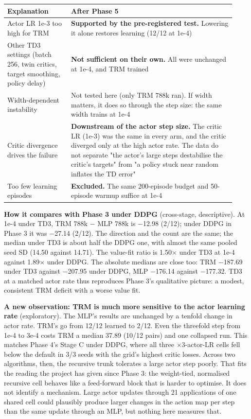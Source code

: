 \documentclass[11pt]{article}
\begin{document}
\begin{center}\small\begin{tabular}{>{\raggedright\arraybackslash}p{0.264\linewidth}>{\raggedright\arraybackslash}p{0.670\linewidth}}
\toprule
Explanation & After Phase 5 \\
\midrule
Actor LR 1e-3 too high for TRM & \textbf{Supported by the pre-registered test.} Lowering it alone restores learning (12/12 at 1e-4) \\
Other TD3 settings (batch 256, twin critics, target smoothing, policy delay) & \textbf{Not sufficient on their own.} All were unchanged at 1e-4, and TRM trained \\
Width-dependent instability & Not tested here (only TRM 788k ran). If width matters, it does so through the step size: the same width trains at 1e-4 \\
Critic divergence drives the failure & \textbf{Downstream of the actor step size.} The critic LR (1e-3) was the same in every arm, and the critic diverged only at the high actor rate. The data do not separate "the actor's large steps destabilise the critic's targets" from "a policy stuck near random inflates the TD error" \\
Too few learning episodes & \textbf{Excluded.} The same 200-episode budget and 50-episode warmup suffice at 1e-4 \\
\bottomrule
\end{tabular}\end{center}



\textbf{How it compares with Phase 3 under DDPG} (cross-stage, descriptive). At 1e-4 under TD3, TRM 788k $-$ MLP 788k is $-$12.98 (2/12); under DDPG in Phase 3 it was $-$27.14 (2/12). The direction and the count are the same; the median under TD3 is about half the DDPG one, with almost the same pooled seed SD (14.50 against 14.71). The value-fit ratio is 1.50$\times$ under TD3 at 1e-4 against 1.89$\times$ under DDPG. The absolute medians are close too: TRM $-$187.69 under TD3 against $-$207.95 under DDPG, MLP $-$176.14 against $-$177.32. TD3 at a matched actor rate thus reproduces Phase 3's qualitative picture: a modest, consistent TRM deficit with a worse value fit.



\textbf{A new observation: TRM is much more sensitive to the actor learning rate} (exploratory). The MLP's results are unchanged by a tenfold change in actor rate. TRM's go from 12/12 learned to 2/12. Even the threefold step from 1e-4 to 3e-4 costs TRM a median 37.89 (10/12 pairs) and one collapsed run. This matches Phase 4's Stage C under DDPG, where all three $\times$3-actor-LR cells fell below the default in 3/3 seeds with the grid's highest critic losses. Across two algorithms, then, the recursive trunk tolerates a large actor step poorly. That fits the reading the project has given since Phase 3: the weight-tied, normalised recursive cell behaves like a feed-forward block that is harder to optimise. It does not identify a mechanism. Large actor updates through 21 applications of one shared cell could plausibly produce larger changes in the action map per step than the same update through an MLP, but nothing here measures that.
\end{document}
